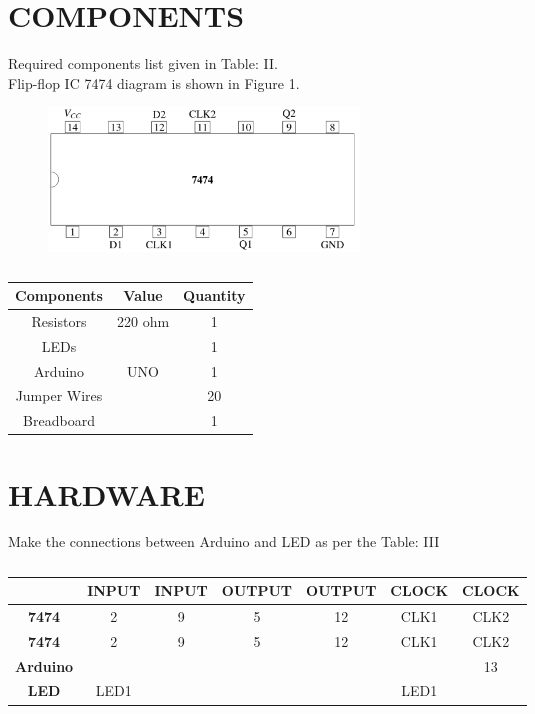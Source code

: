 \documentclass[conference]{IEEEtran}
\begin{document}
\section{COMPONENTS}
Required components list given in Table: II.
\\Flip-flop IC 7474 diagram is shown in Figure 1.
\begin{figure}[h]
\centering
\includegraphics[width=0.4\textwidth]{7474.png}
\caption{\label{fig:Gates}}
\end{figure}
\begin{table}
\centering
\begin{tabular}{| c | c | c |} \hline
Components & Value & Quantity \\\hline
Resistors & 220 ohm & 1 \\
LEDs &  & 1 \\
Arduino & UNO & 1 \\
Jumper Wires &  & 20 \\
Breadboard & & 1 \\ 
\hline
\end{tabular}
\vspace{0.1cm}
\caption{\label{tab:widgets}}
\end{table}
\section{HARDWARE}
Make the connections between Arduino and LED as per the Table: III
\begin{table}
\begin{tabular}{|c | c | c | c | c | c | c |} \hline
 & \textbf{INPUT} & \textbf{INPUT} & \textbf{OUTPUT} & \textbf{OUTPUT} & \textbf{CLOCK} & \textbf{CLOCK} \\\hline
\textbf{7474} & 2 & 9 & 5 & 12 & CLK1 & CLK2 \\\hline
\textbf{7474} & 2 & 9 & 5 & 12 & CLK1 & CLK2 \\\hline 
\textbf{Arduino} & & & & & & 13 \\\hline
\textbf{LED} & LED1 &  &  &  & LED1 & \\\hline
\end{tabular}
\vspace{0.1cm}
\caption{\label{tab:widgets}}
\end{table}
\end{document}
